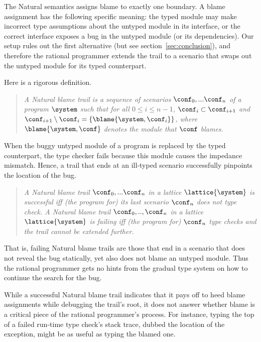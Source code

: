 
The Natural semantics assigns blame to exactly one boundary.  A blame assignment
has the following specific meaning: the typed module may make incorrect type
assumptions about the untyped module in its interface, or the correct
interface exposes a bug in the untyped module (or its dependencies). Our setup rules out the first
alternative (but see section~\ref{sec:conclusion}), and therefore the rational
programmer extends the trail to a scenario that swaps out the untyped
module
for its typed counterpart.


Here is a rigorous definition. 
\begin{quote}
\it A \emph{Natural blame trail} is a sequence of scenarios $\conf_0,...\conf_n$ of
a program $\system$ such that for all $0 \leq i \leq n - 1$, $\conf_i \subset
\conf_{i+1}$ and $\conf_{i+1} \setminus \conf_i =\{\blame{\system, \conf_i}\}$, where
$\blame{\system, \conf}$ denotes the module that $\conf$ blames.
\end{quote}

When the buggy untyped module of a program is replaced by the typed counterpart,
the type checker fails because this module causes the impedance mismatch. Hence, a
trail that ends at an ill-typed scenario successfully pinpoints the location of
the bug. 
\begin{quote}
\it A Natural blame trail $\conf_0,...\conf_n$ in a lattice $\lattice{\system}$ is
\emph{successful} iff (the program for) its last scenario $\conf_n$ does not type check.  A Natural
blame trail $\conf_0,..,\conf_n$ in a lattice $\lattice{\system}$ is \emph{failing}
iff (the program for) $\conf_n$ type checks and the trail cannot be extended further.
\end{quote}
That is, failing Natural blame trails are those that end in a scenario that does not reveal the bug statically, yet also does not blame
an untyped module. Thus the rational programmer gets
no hints from the gradual type system on how to continue the search for the bug.

While a successful Natural blame trail indicates that it 
pays off to heed blame assignments while debugging the trail's root, it does not answer whether
blame is a critical piece of the rational programmer's process.  For instance,
typing the top of a failed run-time type check's stack trace, dubbed the
location of the exception, might be as useful as typing the blamed one.

